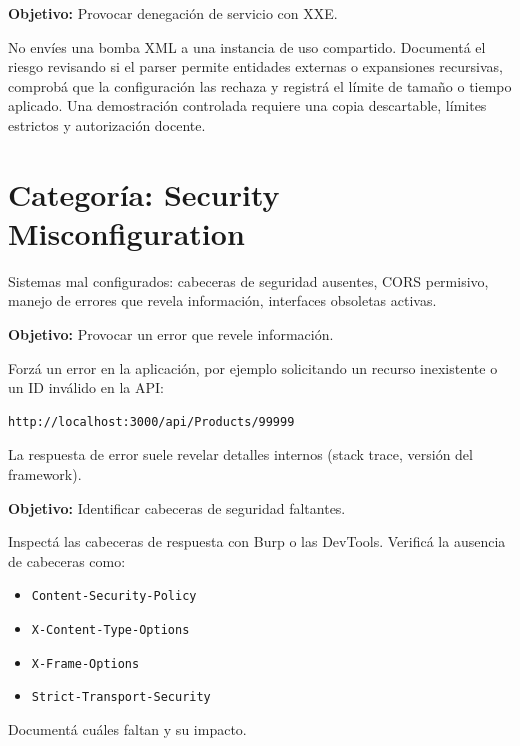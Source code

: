 \documentclass[11pt,a4paper]{article}
\begin{document}
\begin{desafio}
\textbf{Objetivo:} Provocar denegación de servicio con XXE.
\begin{solucion}
No envíes una bomba XML a una instancia de uso compartido. Documentá el riesgo revisando si el parser permite entidades externas o expansiones recursivas, comprobá que la configuración las rechaza y registrá el límite de tamaño o tiempo aplicado. Una demostración controlada requiere una copia descartable, límites estrictos y autorización docente.
\end{solucion}
\end{desafio}

\section{Categoría: Security Misconfiguration}

\begin{teoria}
Sistemas mal configurados: cabeceras de seguridad ausentes, CORS permisivo, manejo de errores que revela información, interfaces obsoletas activas.
\end{teoria}

\begin{desafio}
\textbf{Objetivo:} Provocar un error que revele información.
\begin{solucion}
Forzá un error en la aplicación, por ejemplo solicitando un recurso inexistente o un ID inválido en la API:
\begin{lstlisting}
http://localhost:3000/api/Products/99999
\end{lstlisting}
La respuesta de error suele revelar detalles internos (stack trace, versión del framework).
\end{solucion}
\end{desafio}

\begin{desafio}
\textbf{Objetivo:} Identificar cabeceras de seguridad faltantes.
\begin{solucion}
Inspectá las cabeceras de respuesta con Burp o las DevTools. Verificá la ausencia de cabeceras como:
\begin{itemize}[leftmargin=*]
  \item \texttt{Content-Security-Policy}
  \item \texttt{X-Content-Type-Options}
  \item \texttt{X-Frame-Options}
  \item \texttt{Strict-Transport-Security}
\end{itemize}
Documentá cuáles faltan y su impacto.
\end{solucion}
\end{desafio}
\end{document}
